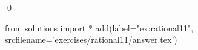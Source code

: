 
\begin{ex} 
  \label{ex:rational11}
  
  \qed
\end{ex} 
\begin{python0}
from solutions import *
add(label="ex:rational11",
    srcfilename='exercises/rational11/answer.tex') 
\end{python0}
